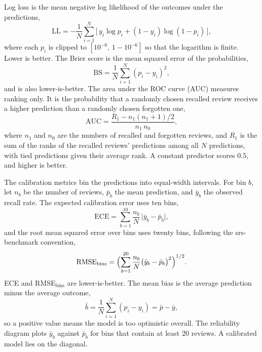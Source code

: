 Log loss is the mean negative log likelihood of the outcomes under the predictions,
\begin{equation}\label{eq:logloss}
  \mathrm{LL} = -\frac{1}{N}\sum_{i=1}^{N}\bigl[\,y_i\log p_i + (1-y_i)\log(1-p_i)\,\bigr],
\end{equation}
where each $p_i$ is clipped to $[10^{-6},\, 1-10^{-6}]$ so that the logarithm is finite. Lower is
better. The Brier score is the mean squared error of the probabilities,
\begin{equation}\label{eq:brier}
  \mathrm{BS} = \frac{1}{N}\sum_{i=1}^{N}(p_i - y_i)^2,
\end{equation}
and is also lower-is-better. The area under the ROC curve (AUC) measures ranking only. It is the
probability that a randomly chosen recalled review receives a higher prediction than a randomly chosen
forgotten one,
\begin{equation}\label{eq:auc}
  \mathrm{AUC} = \frac{R_1 - n_1(n_1+1)/2}{n_1\, n_0},
\end{equation}
where $n_1$ and $n_0$ are the numbers of recalled and forgotten reviews, and $R_1$ is the sum of the
ranks of the recalled reviews' predictions among all $N$ predictions, with tied predictions given their
average rank. A constant predictor scores $0.5$, and higher is better.

The calibration metrics bin the predictions into equal-width intervals. For bin $b$, let $n_b$ be
the number of reviews, $\bar p_b$ the mean prediction, and $\bar y_b$ the observed recall rate. The
expected calibration error uses ten bins,
\begin{equation}\label{eq:ece}
  \mathrm{ECE} = \sum_{b=1}^{10}\frac{n_b}{N}\,\bigl|\bar y_b - \bar p_b\bigr|,
\end{equation}
and the root mean squared error over bins uses twenty bins, following the srs-benchmark convention,
\begin{equation}\label{eq:rmse}
  \mathrm{RMSE}_{\mathrm{bins}} = \Bigl(\sum_{b=1}^{20}\frac{n_b}{N}\bigl(\bar y_b - \bar p_b\bigr)^2\Bigr)^{1/2}.
\end{equation}
ECE and RMSE$_{\mathrm{bins}}$ are lower-is-better. The mean bias is the average prediction minus the
average outcome,
\begin{equation}\label{eq:bias}
  \bar b = \frac{1}{N}\sum_{i=1}^{N}(p_i - y_i) = \bar p - \bar y,
\end{equation}
so a positive value means the model is too optimistic overall. The reliability diagram plots
$\bar y_b$ against $\bar p_b$ for bins that contain at least 20 reviews. A calibrated model lies on
the diagonal.

